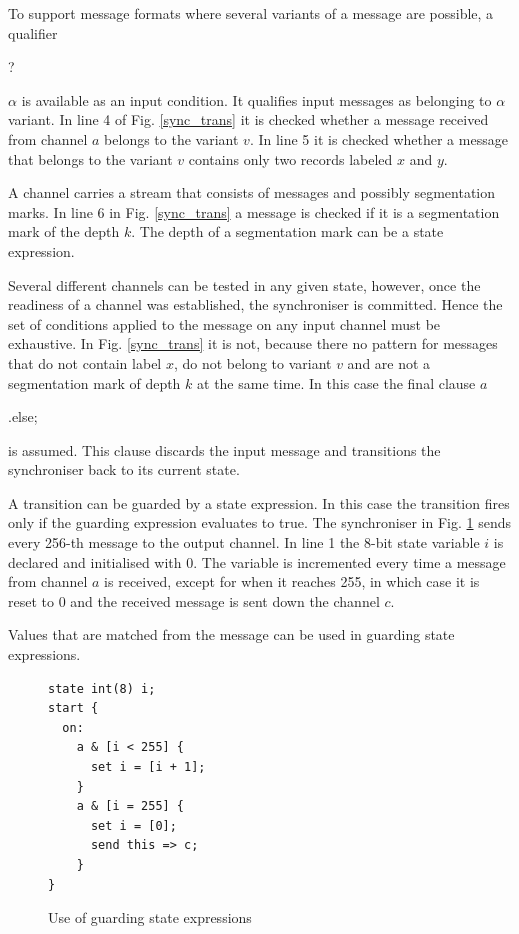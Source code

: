 To support message formats where several variants of a message are possible, a qualifier \begin{bf}?\end{bf}$\alpha$ is available as an input condition. It qualifies input messages as belonging to $\alpha$ variant. In line 4 of Fig. \ref{sync_trans} it is checked whether a message received from channel $a$ belongs to the variant $v$. In line 5 it is checked whether a message that belongs to the variant $v$ contains only two records labeled $x$ and $y$. 

A channel carries a stream that consists of messages and possibly segmentation marks. In line 6 in Fig. \ref{sync_trans} a message is checked if it is a segmentation mark of the depth $k$. The depth of a segmentation mark can be a state expression.

Several different channels can be tested in any given state, however, once the readiness of a channel was established, the synchroniser is committed. Hence the set of conditions applied to the message on any input channel must be exhaustive. In Fig. \ref{sync_trans} it is not, because there no pattern for messages that do not contain label $x$, do not belong to variant $v$ and are not a segmentation mark of depth $k$ at the same time. In this case the final clause $a$\begin{bf}.else;\end{bf} is assumed. This clause discards the input message and transitions the synchroniser back to its current state.

A transition can be guarded by a state expression. In this case the transition fires only if the guarding expression evaluates to true. The synchroniser in Fig. \ref{sync_g_state_exp} sends every 256-th message to the output channel. In line 1 the 8-bit state variable $i$ is declared and initialised with 0. The variable is incremented every time a message from channel $a$ is received, except for when it reaches 255, in which case it is reset to 0 and the received message is sent down the channel $c$. 

Values that are matched from the message can be used in guarding state expressions.
\begin{figure}[h!]
\lstset{numbers=left, numberstyle=\small, stepnumber=1, numbersep=8pt}
\begin{lstlisting}[frame=single]
state int(8) i;
start {
  on:
    a & [i < 255] {
      set i = [i + 1];
    }
    a & [i = 255] {
      set i = [0];
      send this => c;
    }
}
\end{lstlisting}
\caption{Use of guarding state expressions}
\label{sync_g_state_exp}
\end{figure}


